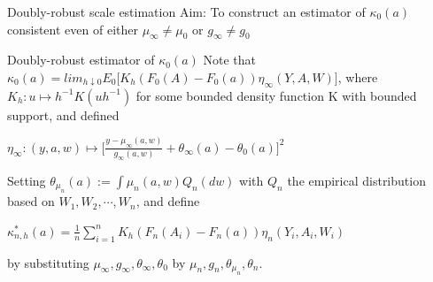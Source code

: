 \documentclass{beamer}
\newcommand{\sn}{\sum_{i=1}^n}
\begin{document}


\begin{frame}{Doubly-robust scale estimation}
	Aim: To construct an estimator of $\kappa_0(a)$ consistent even of either $\mu_{\infty} \neq \mu_0$ or $g_{\infty} \neq g_0$
\begin{block}{Doubly-robust estimator of $\kappa_0(a)$}
	Note that $\kappa_0(a)=lim_{h\downarrow 0} E_0 \big[ K_h (F_0(A)-F_0(a)) \eta_{\infty}(Y,A,W) \big]$, where $K_h:u \mapsto h^{-1} K(uh^{-1})$ for some bounded density function K with bounded support, and defined
	\begin{center}
	$\eta_{\infty}:(y,a,w)\mapsto \Bigg[ \frac{y-\mu_{\infty}(a,w)}{g_{\infty}(a,w)} + \theta_{\infty}(a) - \theta_0(a)\Bigg]^2$
	\end{center}
	Setting $\theta_{\mu_n}(a):= \int \mu_n(a,w)Q_n(dw)$ with $Q_n$ the empirical distribution based on $W_1,W_2,\cdots,W_n$, and define
	\begin{center}
	$\kappa^{*}_{n,h}(a)=\frac{1}{n} \sn  K_h (F_n(A_i)-F_n(a)) \eta_{n}(Y_i,A_i,W_i)$
	\end{center}
	by substituting $\mu_{\infty},g_{\infty},\theta_{{\infty}},\theta_0$ by $\mu_n,g_n,\theta_{\mu_n},\theta_n$.
\end{block}

\end{frame}

\end{document}
